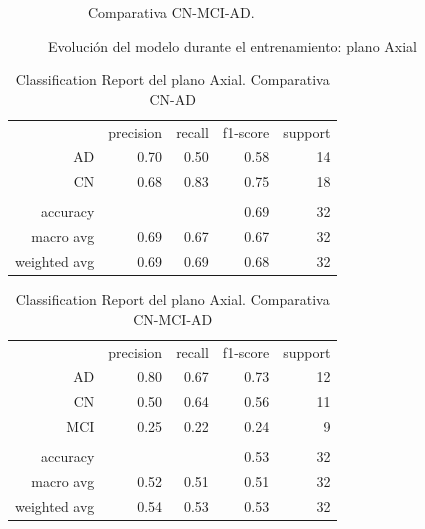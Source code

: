 \begin{figure}[H]
\begin{subfigure}{0.45\textwidth}
        \caption{Comparativa CN-MCI-AD. }
        \label{fig:axial-c-mci-ad}
    \end{subfigure}
    \caption{Evolución del modelo durante el entrenamiento: plano Axial} \label{fig:axial-model}
\end{figure}

\begin{table}[H]
    \centering
    \begin{tabular}{r r r r r}
        & precision & recall & f1-score & support \\
        AD & 0.70 & 0.50 & 0.58 & 14 \\
        CN & 0.68 & 0.83 & 0.75 & 18 \\
        & & & & \\
        accuracy &  &  & 0.69 & 32 \\
        macro avg & 0.69 & 0.67 & 0.67 & 32 \\
        weighted avg & 0.69 & 0.69 & 0.68 & 32 \\
    \end{tabular}
    \caption{Classification Report del plano Axial. Comparativa CN-AD}
    \label{tab:cr-axial-cn-ad}
\end{table}

\begin{table}[H]
    \centering
    \begin{tabular}{r r r r r}
        & precision & recall & f1-score & support \\
        AD & 0.80 & 0.67 & 0.73 & 12 \\
        CN & 0.50 & 0.64 & 0.56 & 11 \\
        MCI & 0.25 & 0.22 & 0.24 & 9 \\
        & & & & \\
        accuracy &  &  & 0.53 & 32 \\
        macro avg & 0.52 & 0.51 & 0.51 & 32 \\
        weighted avg & 0.54 & 0.53 & 0.53 & 32 \\
    \end{tabular}
    \caption{Classification Report del plano Axial. Comparativa CN-MCI-AD}
    \label{tab:cr-axial-cn-mci-ad}
\end{table}


